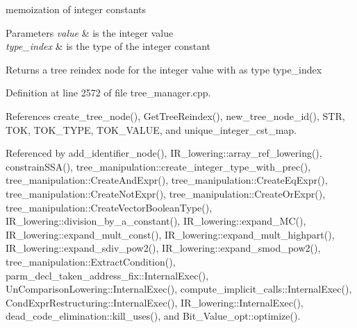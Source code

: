 memoization of integer constants 


\begin{DoxyParams}{Parameters}
{\em value} & is the integer value \\
\hline
{\em type\+\_\+index} & is the type of the integer constant \\
\hline
\end{DoxyParams}
\begin{DoxyReturn}{Returns}
a tree reindex node for the integer value with as type type\+\_\+index 
\end{DoxyReturn}


Definition at line 2572 of file tree\+\_\+manager.\+cpp.



References create\+\_\+tree\+\_\+node(), Get\+Tree\+Reindex(), new\+\_\+tree\+\_\+node\+\_\+id(), S\+TR, T\+OK, T\+O\+K\+\_\+\+T\+Y\+PE, T\+O\+K\+\_\+\+V\+A\+L\+UE, and unique\+\_\+integer\+\_\+cst\+\_\+map.



Referenced by add\+\_\+identifier\+\_\+node(), I\+R\+\_\+lowering\+::array\+\_\+ref\+\_\+lowering(), constrain\+S\+S\+A(), tree\+\_\+manipulation\+::create\+\_\+integer\+\_\+type\+\_\+with\+\_\+prec(), tree\+\_\+manipulation\+::\+Create\+And\+Expr(), tree\+\_\+manipulation\+::\+Create\+Eq\+Expr(), tree\+\_\+manipulation\+::\+Create\+Not\+Expr(), tree\+\_\+manipulation\+::\+Create\+Or\+Expr(), tree\+\_\+manipulation\+::\+Create\+Vector\+Boolean\+Type(), I\+R\+\_\+lowering\+::division\+\_\+by\+\_\+a\+\_\+constant(), I\+R\+\_\+lowering\+::expand\+\_\+\+M\+C(), I\+R\+\_\+lowering\+::expand\+\_\+mult\+\_\+const(), I\+R\+\_\+lowering\+::expand\+\_\+mult\+\_\+highpart(), I\+R\+\_\+lowering\+::expand\+\_\+sdiv\+\_\+pow2(), I\+R\+\_\+lowering\+::expand\+\_\+smod\+\_\+pow2(), tree\+\_\+manipulation\+::\+Extract\+Condition(), parm\+\_\+decl\+\_\+taken\+\_\+address\+\_\+fix\+::\+Internal\+Exec(), Un\+Comparison\+Lowering\+::\+Internal\+Exec(), compute\+\_\+implicit\+\_\+calls\+::\+Internal\+Exec(), Cond\+Expr\+Restructuring\+::\+Internal\+Exec(), I\+R\+\_\+lowering\+::\+Internal\+Exec(), dead\+\_\+code\+\_\+elimination\+::kill\+\_\+uses(), and Bit\+\_\+\+Value\+\_\+opt\+::optimize().

